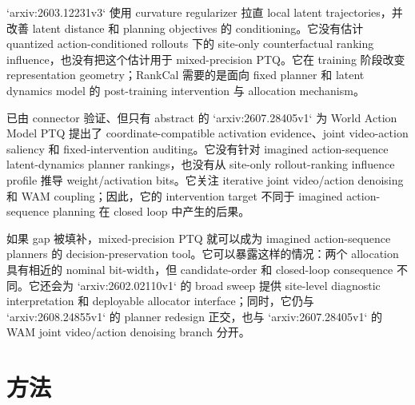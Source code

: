 \documentclass[10pt,a4paper]{article}
\begin{document}
`arxiv:2603.12231v3` 使用 curvature regularizer 拉直 local latent trajectories，并改善 latent distance 和 planning objectives 的 conditioning。它没有估计 quantized action-conditioned rollouts 下的 site-only counterfactual ranking influence，也没有把这个估计用于 mixed-precision PTQ。它在 training 阶段改变 representation geometry；RankCal 需要的是面向 fixed planner 和 latent dynamics model 的 post-training intervention 与 allocation mechanism。

已由 connector 验证、但只有 abstract 的 `arxiv:2607.28405v1` 为 World Action Model PTQ 提出了 coordinate-compatible activation evidence、joint video-action saliency 和 fixed-intervention auditing。它没有针对 imagined action-sequence latent-dynamics planner rankings，也没有从 site-only rollout-ranking influence profile 推导 weight/activation bits。它关注 iterative joint video/action denoising 和 WAM coupling；因此，它的 intervention target 不同于 imagined action-sequence planning 在 closed loop 中产生的后果。

如果 gap 被填补，mixed-precision PTQ 就可以成为 imagined action-sequence planners 的 decision-preservation tool。它可以暴露这样的情况：两个 allocation 具有相近的 nominal bit-width，但 candidate-order 和 closed-loop consequence 不同。它还会为 `arxiv:2602.02110v1` 的 broad sweep 提供 site-level diagnostic interpretation 和 deployable allocator interface；同时，它仍与 `arxiv:2608.24855v1` 的 planner redesign 正交，也与 `arxiv:2607.28405v1` 的 WAM joint video/action denoising branch 分开。
\section*{方法}
\end{document}
